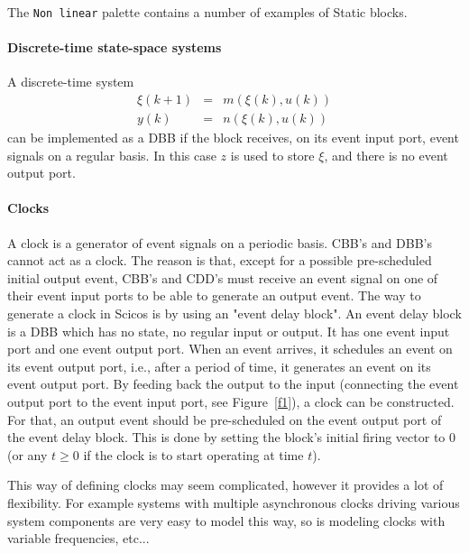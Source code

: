 \documentclass{book}
\begin{document}
\bigskip

The {\tt Non linear} palette contains a number of
examples of Static blocks.

\paragraph{Discrete-time state-space systems}
A discrete-time system
\begin{eqnarray}
\xi(k+1)&=&m(\xi(k),u(k)) \\
y(k)&=&n(\xi(k),u(k))
\end{eqnarray}
can be implemented as a DBB if the block
receives, on its event input port, event signals on a regular
basis. In this case $z$ is used to store $\xi$, and
there is no event output port. 

\paragraph{Clocks}
A clock is a generator of event signals on a periodic basis. CBB's and
DBB's cannot act as a
clock. The reason is that, except for a possible pre-scheduled initial
output event, CBB's and CDD's must receive an event signal on
one of their event input ports to be able to generate an output
event. The way to generate a clock in Scicos   is by using an "event 
delay block". An event delay block is a DBB which has
no state, no regular input or output. It has one event input port and
one event output port. When an event arrives, it schedules an event
on its event output port, i.e., after a period of time,
it generates an event on its event output port. By feeding back the
output to the input (connecting the event output port to the event
input port, see Figure~\ref{f1}), a clock can be constructed. For that,
an output event 
should be pre-scheduled on the event output port of the event delay
block. This is 
done by setting the block's initial firing vector to 0 (or any $t\ge
0$ if the clock is to start operating at time $t$).



This way of defining clocks may seem complicated, however it provides
a lot of flexibility. For example systems with  multiple asynchronous
clocks driving various system components are very easy to model this
way, so is modeling clocks with variable frequencies, etc...
\end{document}

